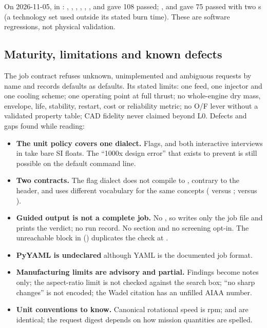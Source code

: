 On 2026-11-05, in : , , , , , ,  and  gave 108 passed; ,  and  gave 75 passed with two s (a technology set used outside its stated burn time). These are software regressions, not physical validation.

\subsection{Maturity, limitations and known defects}\label{sec:s02-defects}

The job contract refuses unknown, unimplemented and ambiguous requests by name and records defaults as defaults. Its stated limits: one feed, one injector and one cooling scheme; one operating point at full thrust; no whole-engine dry mass, envelope, life, stability, restart, cost or reliability metric; no O/F lever without a validated property table; CAD fidelity never claimed beyond L0. Defects and gaps found while reading:
\begin{itemize}
  \item \textbf{The unit policy covers one dialect.} Flags,  and both interactive interviews in  take bare SI floats. The ``1000x design error'' that  exists to prevent is still possible on the default command line.
  \item \textbf{Two contracts.} The flag dialect does not compile to , contrary to the  header, and uses different vocabulary for the same concepts (  versus  ;  versus ).
  \item \textbf{Guided output is not a complete job.} No , so      writes only the job file and prints the verdict; no run record. No  section and no screening opt-in. The unreachable     block in  () duplicates the check at .
  \item \textbf{PyYAML is undeclared} although YAML is the documented job format.
  \item \textbf{Manufacturing limits are advisory and partial.} Findings become notes only; the aspect-ratio limit is not checked against the search box; ``no sharp changes'' is not encoded; the Wadel citation has an unfilled AIAA number.
  \item \textbf{Unit conventions to know.} Canonical rotational speed is rpm;  and  are identical; the request digest depends on how mission quantities are spelled.
\end{itemize}

